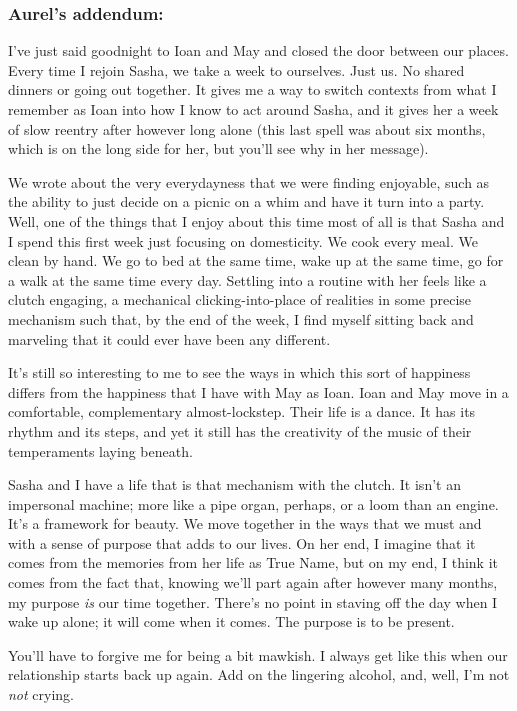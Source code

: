 \hypertarget{aurels-addendum}{%
\subsubsection{Aurel's addendum:}\label{aurels-addendum}}

I've just said goodnight to Ioan and May and closed the door between our places. Every time I rejoin Sasha, we take a week to ourselves. Just us. No shared dinners or going out together. It gives me a way to switch contexts from what I remember as Ioan into how I know to act around Sasha, and it gives her a week of slow reentry after however long alone (this last spell was about six months, which is on the long side for her, but you'll see why in her message).

We wrote about the very everydayness that we were finding enjoyable, such as the ability to just decide on a picnic on a whim and have it turn into a party. Well, one of the things that I enjoy about this time most of all is that Sasha and I spend this first week just focusing on domesticity. We cook every meal. We clean by hand. We go to bed at the same time, wake up at the same time, go for a walk at the same time every day. Settling into a routine with her feels like a clutch engaging, a mechanical clicking-into-place of realities in some precise mechanism such that, by the end of the week, I find myself sitting back and marveling that it could ever have been any different.

It's still so interesting to me to see the ways in which this sort of happiness differs from the happiness that I have with May as Ioan. Ioan and May move in a comfortable, complementary almost-lockstep. Their life is a dance. It has its rhythm and its steps, and yet it still has the creativity of the music of their temperaments laying beneath.

Sasha and I have a life that is that mechanism with the clutch. It isn't an impersonal machine; more like a pipe organ, perhaps, or a loom than an engine. It's a framework for beauty. We move together in the ways that we must and with a sense of purpose that adds to our lives. On her end, I imagine that it comes from the memories from her life as True Name, but on my end, I think it comes from the fact that, knowing we'll part again after however many months, my purpose \emph{is} our time together. There's no point in staving off the day when I wake up alone; it will come when it comes. The purpose is to be present.

You'll have to forgive me for being a bit mawkish. I always get like this when our relationship starts back up again. Add on the lingering alcohol, and, well, I'm not \emph{not} crying.

